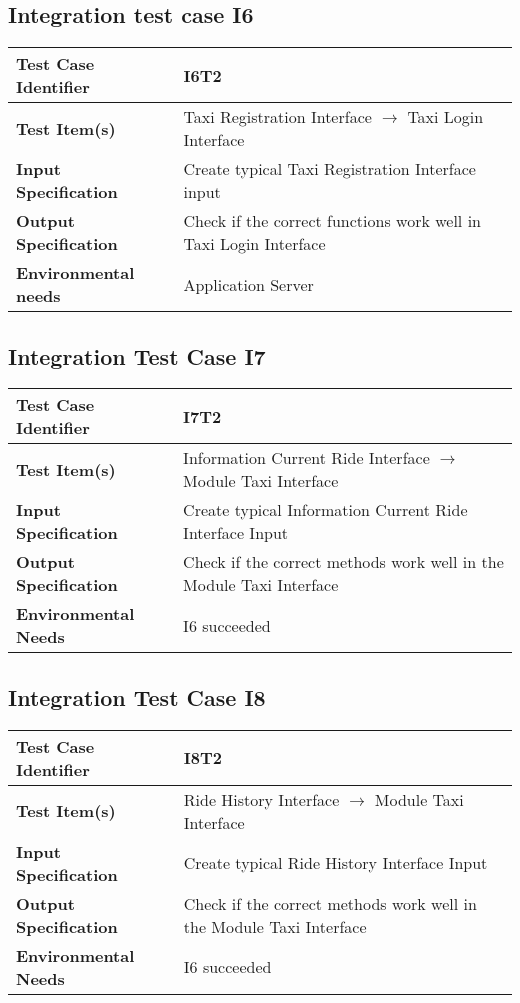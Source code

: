 \subsection{Integration test case I6}
\begin{tabular} {l p{9cm}}
	\hline \textbf{Test Case Identifier} & I6T2 \\
	\hline \textbf{Test Item(s)} & Taxi Registration Interface $\rightarrow$ Taxi Login Interface \\
	\hline \textbf{Input Specification} & Create typical Taxi Registration Interface input \\
	\hline \textbf{Output Specification} & Check if the correct functions work well in Taxi Login Interface \\
	\hline \textbf{Environmental needs} & Application Server \\
	\hline 
\end{tabular}
\vspace{0.5cm}
\subsection{Integration Test Case I7}
\begin{tabular}{l p{9cm}}
	\hline
	\textbf{Test	Case Identifier} & I7T2 \\ \hline
	\textbf{Test	Item(s)} & Information Current Ride Interface $\rightarrow$ Module Taxi Interface \\ \hline
	\textbf{Input Specification} & Create typical Information Current Ride Interface Input\\ \hline
	\textbf{Output Specification} & Check if the correct methods work well in the Module Taxi Interface \\ \hline
	\textbf{Environmental Needs} & I6 succeeded \\ \hline
\end{tabular}
\vspace{0.5cm}
\subsection{Integration Test Case I8}
\begin{tabular}{l p{9cm}}
	\hline
	\textbf{Test	Case Identifier} & I8T2 \\ \hline
	\textbf{Test	Item(s)} & Ride History Interface $\rightarrow$ Module Taxi Interface \\ \hline
	\textbf{Input Specification} & Create typical Ride History Interface Input\\ \hline
	\textbf{Output Specification} & Check if the correct methods work well in the Module Taxi Interface \\ \hline
	\textbf{Environmental Needs} & I6 succeeded \\ \hline
\end{tabular}
\vspace{0.5cm}
